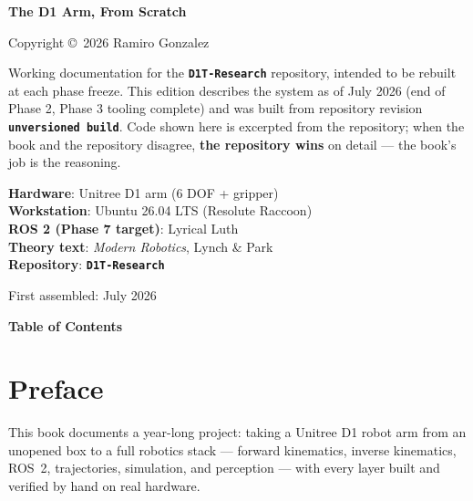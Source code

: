 \documentclass[11pt,twoside,openright]{book}
\newcommand{\headingfont}{\sffamily}
\newcommand{\code}[1]{\texttt{\bfseries #1}}
\begin{document}
\providecommand{\repocommit}{unversioned build}
\thispagestyle{empty}
{\headingfont\bfseries\large The D1 Arm, From Scratch\par}
\vspace{1em}
Copyright \copyright\ 2026 Ramiro Gonzalez

\vspace{1em}
Working documentation for the \code{D1T-Research} repository, intended to
be rebuilt at each phase freeze. This edition describes the system as of
July 2026 (end of Phase 2, Phase 3 tooling complete) and was built from
repository revision \code{\repocommit}. Code shown here is excerpted from
the repository; when the book and the repository disagree, \textbf{the
repository wins} on detail --- the book's job is the reasoning.

\vspace{1em}
\textbf{Hardware}: Unitree D1 arm (6 DOF + gripper) \\
\textbf{Workstation}: Ubuntu 26.04 LTS (Resolute Raccoon) \\
\textbf{ROS 2 (Phase 7 target)}: Lyrical Luth \\
\textbf{Theory text}: \textit{Modern Robotics}, Lynch \& Park \\
\textbf{Repository}: \code{D1T-Research}

\vspace{1em}
First assembled: July 2026

\newpage

\thispagestyle{empty}
{\headingfont\bfseries\huge Table of Contents\par}
\vspace{1.5em}
\tableofcontents
\newpage

\chapter*{Preface}

This book documents a year-long project: taking a Unitree D1 robot arm from
an unopened box to a full robotics stack --- forward kinematics, inverse
kinematics, ROS~2, trajectories, simulation, and perception --- with every
layer built and verified by hand on real hardware.
\end{document}
